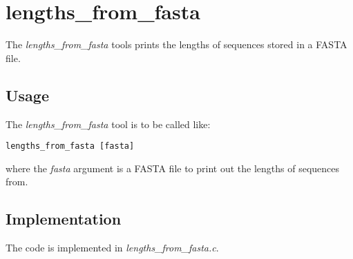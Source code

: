 \section{lengths\_from\_fasta} \label{sec-lengthsfromfasta}

The \emph{lengths\_from\_fasta} tools prints the lengths of sequences
stored in a FASTA file.

\subsection{Usage}

The \emph{lengths\_from\_fasta} tool is to be called like:
\begin{lstlisting}
lengths_from_fasta [fasta]
\end{lstlisting}
where the \emph{fasta} argument is a FASTA file to print out the
lengths of sequences from.

\subsection{Implementation}
The code is implemented in \emph{lengths\_from\_fasta.c}.

